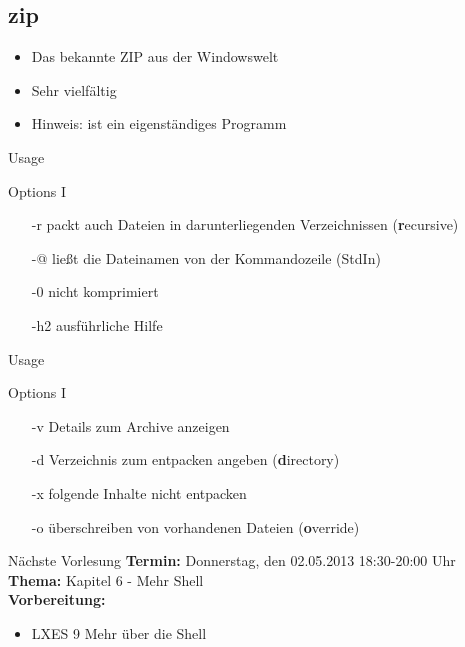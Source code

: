 \documentclass[aspectratio=43]{beamer}
\begin{document}
\subsection{zip}
\begin{frame} 
	\begin{block}{} 
	\begin{itemize}
	\item Das bekannte ZIP aus der Windowswelt
	\item Sehr vielfältig
	\item Hinweis:  ist ein eigenständiges Programm
	\end{itemize}
	\end{block}
\end{frame}

\begin{frame} 
	\begin{exampleblock}{Usage}
	\end{exampleblock}

	\begin{exampleblock}{Options I}
	\begin{itemize}
	\item[-r] packt auch Dateien in darunterliegenden Verzeichnissen (\textbf{r}ecursive)
	\item[-@] ließt die Dateinamen von der Kommandozeile (StdIn)
	\item[-0] nicht komprimiert
	\item[-h2] ausführliche Hilfe
	\end{itemize}
	\end{exampleblock}
\end{frame}

\begin{frame} 
	\begin{exampleblock}{Usage}
	\end{exampleblock}

	\begin{exampleblock}{Options I}
	\begin{itemize}
	\item[-v] Details zum Archive anzeigen
	\item[-d] Verzeichnis zum entpacken angeben (\textbf{d}irectory)
	\item[-x] folgende Inhalte nicht entpacken
	\item[-o] überschreiben von vorhandenen Dateien (\textbf{o}verride)
	\end{itemize}
	\end{exampleblock}
\end{frame}



\begin{frame}[plain]
\begin{alertblock}{Nächste Vorlesung}
\textbf{Termin:} Donnerstag, den 02.05.2013 18:30-20:00 Uhr\\
\textbf{Thema:} Kapitel 6 - Mehr Shell \\
\textbf{Vorbereitung:} 
\begin{itemize}
\item LXES 9 Mehr über die Shell
\end{itemize}
\end{alertblock}
\end{frame}

\materialframe
\end{document}
